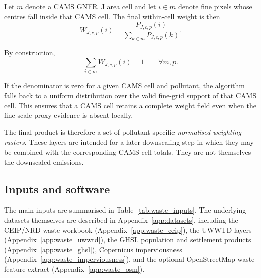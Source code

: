 Let $m$ denote a CAMS GNFR~J area cell and let $i \in m$ denote fine
pixels whose centres fall inside that CAMS cell. The final within-cell
weight is then
\begin{equation}
  W_{J,c,p}(i) =
  \frac{P_{J,c,p}(i)}
       {\displaystyle\sum_{k \in m} P_{J,c,p}(k)}.
\end{equation}

By construction,
\begin{equation}
  \sum_{i \in m} W_{J,c,p}(i) = 1
  \qquad \forall m,p.
\end{equation}

If the denominator is zero for a given CAMS cell and pollutant, the
algorithm falls back to a uniform distribution over the valid fine-grid
support of that CAMS cell. This ensures that a CAMS cell retains a
complete weight field even when the fine-scale proxy evidence is absent
locally.

The final product is therefore a set of pollutant-specific
\emph{normalised weighting rasters}. These layers are intended for a
later downscaling step in which they may be combined with the
corresponding CAMS cell totals. They are not themselves the downscaled
emissions.

\subsection{Inputs and software}

The main inputs are summarised in
Table~\ref{tab:waste_inputs}. The underlying datasets themselves are
described in Appendix~\ref{app:datasets}, including the CEIP/NRD waste
workbook (Appendix~\ref{app:waste_ceip}), the UWWTD layers
(Appendix~\ref{app:waste_uwwtd}), the GHSL population and settlement
products (Appendix~\ref{app:waste_ghsl}), Copernicus imperviousness
(Appendix~\ref{app:waste_imperviousness}), and the optional
OpenStreetMap waste-feature extract (Appendix~\ref{app:waste_osm}).

